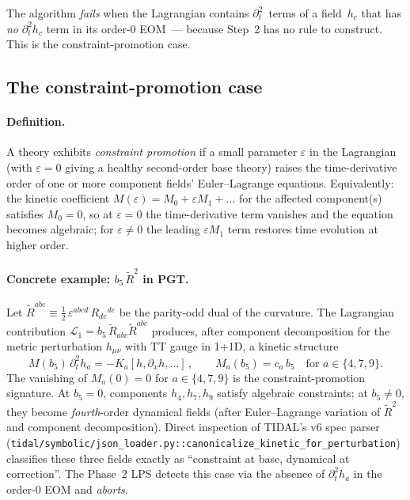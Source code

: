 The algorithm \emph{fails} when the Lagrangian contains
$\partial_t^2$~terms of a field~$h_c$ that has \emph{no} $\partial_t^2 h_c$
term in its order-0 EOM~--- because Step~2 has no rule to construct.
This is the constraint-promotion case.

\subsection{The constraint-promotion case}
\label{sec:pr-cb-promotion}

\paragraph{Definition.}
A theory exhibits \emph{constraint promotion} if a small parameter $\varepsilon$
in the Lagrangian (with $\varepsilon = 0$ giving a healthy second-order base
theory) raises the time-derivative order of one or more component fields'
Euler--Lagrange equations.  Equivalently: the kinetic coefficient
$M(\varepsilon) = M_0 + \varepsilon M_1 + \dots$ for the affected component(s)
satisfies $M_0 = 0$, so at $\varepsilon = 0$ the time-derivative term vanishes
and the equation becomes algebraic; for $\varepsilon \ne 0$ the leading
$\varepsilon M_1$ term restores time evolution at higher order.

\paragraph{Concrete example: $b_5\,\tilde{R}^2$ in PGT.}
Let $\tilde{R}^{abc} \equiv \frac{1}{2}\,\varepsilon^{abcd}\, R_{de}{}^{de}$ be the
parity-odd dual of the curvature.  The Lagrangian contribution
$\mathcal{L}_1 = b_5\,\tilde{R}_{abc}\tilde{R}^{abc}$ produces, after component
decomposition for the metric perturbation $h_{\mu\nu}$ with TT gauge in
1+1D, a kinetic structure
\begin{equation}
  M(b_5)\,\partial_t^2 h_a = -K_a[h, \partial_x h, \dots] \,, \qquad
  M_a(b_5) = c_a\, b_5 \quad\text{for } a \in \{4, 7, 9\}.
  \label{eq:pr-cb-Mb5}
\end{equation}
The vanishing of $M_a(0) = 0$ for $a \in \{4, 7, 9\}$ is the constraint-promotion
signature.  At $b_5 = 0$, components $h_4, h_7, h_9$ satisfy algebraic
constraints; at $b_5 \ne 0$, they become \emph{fourth}-order dynamical fields
(after Euler--Lagrange variation of $\tilde{R}^2$ and component decomposition).
Direct inspection of TIDAL's v6 spec parser
(\texttt{tidal/symbolic/json\_loader.py::canonicalize\_kinetic\_for\_perturbation})
classifies these three fields exactly as ``constraint at base, dynamical at
correction''.  The Phase~2 LPS detects this case via the absence of
$\partial_t^2 h_a$ in the order-0 EOM and \emph{aborts}.

